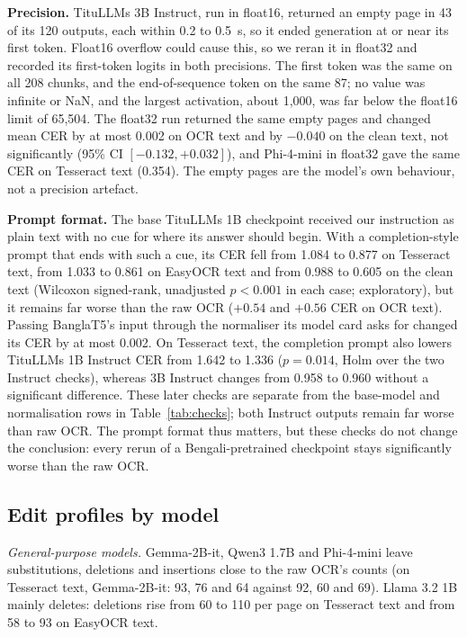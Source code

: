 \documentclass[conference]{IEEEtran}
\begin{document}
\textbf{Precision.} TituLLMs 3B Instruct, run in float16, returned an empty page in 43 of its 120 outputs, each within 0.2 to 0.5~s, so it ended generation at or near its first token. Float16 overflow could cause this, so we reran it in float32 and recorded its first-token logits in both precisions. The first token was the same on all 208 chunks, and the end-of-sequence token on the same 87; no value was infinite or NaN, and the largest activation, about 1{,}000, was far below the float16 limit of 65{,}504. The float32 run returned the same empty pages and changed mean CER by at most 0.002 on OCR text and by $-0.040$ on the clean text, not significantly (95\% CI $[-0.132,+0.032]$), and Phi-4-mini in float32 gave the same CER on Tesseract text (0.354). The empty pages are the model's own behaviour, not a precision artefact.

\textbf{Prompt format.} The base TituLLMs 1B checkpoint received our instruction as plain text with no cue for where its answer should begin. With a completion-style prompt that ends with such a cue, its CER fell from 1.084 to 0.877 on Tesseract text, from 1.033 to 0.861 on EasyOCR text and from 0.988 to 0.605 on the clean text (Wilcoxon signed-rank, unadjusted $p<0.001$ in each case; exploratory), but it remains far worse than the raw OCR ($+0.54$ and $+0.56$ CER on OCR text). Passing BanglaT5's input through the normaliser its model card asks for changed its CER by at most 0.002. On Tesseract text, the completion prompt also lowers TituLLMs 1B Instruct CER from 1.642 to 1.336 ($p=0.014$, Holm over the two Instruct checks), whereas 3B Instruct changes from 0.958 to 0.960 without a significant difference. These later checks are separate from the base-model and normalisation rows in Table~\ref{tab:checks}; both Instruct outputs remain far worse than raw OCR. The prompt format thus matters, but these checks do not change the conclusion: every rerun of a Bengali-pretrained checkpoint stays significantly worse than the raw OCR.





\subsection{Edit profiles by model}
\label{sec:profiles}

\emph{General-purpose models.} Gemma-2B-it, Qwen3 1.7B and Phi-4-mini leave substitutions, deletions and insertions close to the raw OCR's counts (on Tesseract text, Gemma-2B-it: 93, 76 and 64 against 92, 60 and 69). Llama 3.2 1B mainly deletes: deletions rise from 60 to 110 per page on Tesseract text and from 58 to 93 on EasyOCR text.
\end{document}
